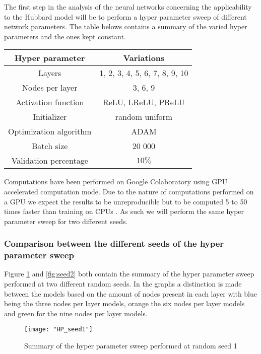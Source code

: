 \documentclass[12pt]{article}
\begin{document}
The first step in the analysis of the neural networks concerning the applicability to the Hubbard model will be to perform a hyper parameter sweep of different network parameters. The table belows contains a summary of the varied hyper parameters and the ones kept constant.
\begin{center}
	\begin{tabular}{|c|c|}
		\hline
		Hyper parameter & Variations \\
		\hline
		Layers & 1, 2, 3, 4, 5, 6, 7, 8, 9, 10 \\
		Nodes per layer & 3, 6, 9 \\
		Activation function & ReLU, LReLU, PReLU \\
		Initializer & random uniform \\
		Optimization algorithm & ADAM \\
		Batch size & 20 000 \\
		Validation percentage & $10\%$ \\ 
		\hline 
	\end{tabular}
\end{center}
Computations have been performed on Google Colaboratory using GPU accelerated computation mode. Due to the nature of computations performed on a GPU we expect the results to be unreproducible but to be computed 5 to 50 times faster than training on CPUs \cite{Tsuchida, Vanhoucke2011}. As such we will perform the same hyper parameter sweep for two different seeds.

\subsubsection{Comparison between the different seeds of the hyper parameter sweep}

Figure \ref{fig:seed1} and \ref{fig:seed2} both contain the summary of the hyper parameter sweep performed at two different random seeds. In the graphs a distinction is made between the models based on the amount of nodes present in each layer with blue being the three nodes per layer models, orange the six nodes per layer models and green for the nine nodes per layer models. 

\begin{figure}[H]
	\centering
	\texttt{[image: "HP\_seed1"]}
	\caption{Summary of the hyper parameter sweep performed at random seed 1}
	\label{fig:seed1}
\end{figure}
\end{document}
